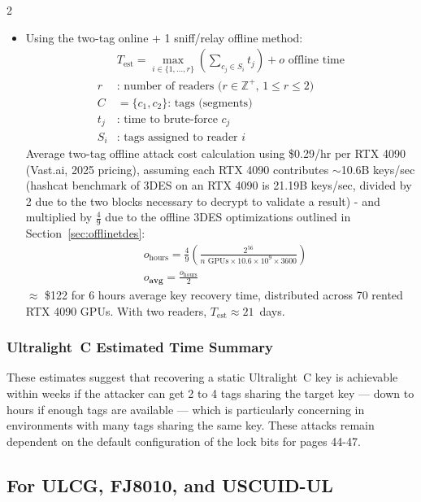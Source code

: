 \documentclass[10pt,letterpaper]{article}
\begin{document}
\begin{multicols}{2}
\begin{itemize}
    \item Using the two-tag online + 1 sniff/relay offline method:
    \[
    \begin{aligned}
    &T_{\text{est}} = \max_{i \in \{1, \dots, r\}} \left( \sum_{c_j \in S_i} t_j \right) + {o}\text{ offline time} \\
    r &\text{: number of readers (}r \in \mathbb{Z}^+\text{, }1 \leq r \leq 2\text{)} \\
    C &= \{c_1, c_2\} \text{: tags (segments)} \\
    t_j &\text{: time to brute-force } c_j \\
    S_i &\text{: tags assigned to reader } i
    \end{aligned}
    \]
    Average two-tag offline attack cost calculation using \$0.29/hr per RTX 4090 (Vast.ai, 2025 pricing), assuming each RTX 4090 contributes $\sim$10.6B keys/sec (hashcat benchmark of 3DES on an RTX 4090 is 21.19B keys/sec, divided by 2 due to the two blocks necessary to decrypt to validate a result) - and multiplied by $\frac{4}{9}$ due to the offline 3DES optimizations outlined in Section~\ref{sec:offlinetdes}:
    \[
    \begin{aligned}
    &o_{\text{hours}} = \frac{4}{9} \left( \frac{2^{56}}{n\text{ GPUs} \times 10.6 \times 10^9 \times 3600} \right) \\
    &o_{\mathbf{avg}} = \frac{o_{\text{hours}}}{2}
    \end{aligned}
    \]
    $\approx$ \$122 for 6 hours average key recovery time, distributed across 70 rented RTX 4090 GPUs. With two readers, $T_{\text{est}} \approx 21$~days.
\end{itemize}
\subsubsection*{Ultralight~C Estimated Time Summary}
These estimates suggest that recovering a static Ultralight~C key is achievable within weeks if the attacker can get 2 to 4 tags sharing the target key --- down to hours if enough tags are available --- which is particularly concerning in environments with many tags sharing the same key. These attacks remain dependent on the default configuration of the lock bits for pages 44-47.

\subsection{For ULCG, FJ8010, and USCUID-UL}
\label{sec_estimate_counterfeit}

\end{multicols}
\end{document}
